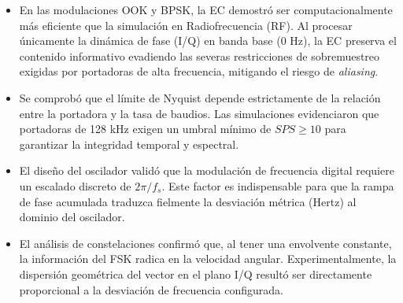
\begin{itemize}
    \item En las modulaciones OOK y BPSK, la EC demostró ser computacionalmente más eficiente que la simulación en Radiofrecuencia (RF). Al procesar únicamente la dinámica de fase (I/Q) en banda base (0 Hz), la EC preserva el contenido informativo evadiendo las severas restricciones de sobremuestreo exigidas por portadoras de alta frecuencia, mitigando el riesgo de \textit{aliasing}.
    
    \item Se comprobó que el límite de Nyquist depende estrictamente de la relación entre la portadora y la tasa de baudios. Las simulaciones evidenciaron que portadoras de 128 kHz exigen un umbral mínimo de $SPS \geq 10$ para garantizar la integridad temporal y espectral.
    
    \item El diseño del oscilador validó que la modulación de frecuencia digital requiere un escalado discreto de $2\pi/f_s$. Este factor es indispensable para que la rampa de fase acumulada traduzca fielmente la desviación métrica (Hertz) al dominio del oscilador.
    
    \item El análisis de constelaciones confirmó que, al tener una envolvente constante, la información del FSK radica en la velocidad angular. Experimentalmente, la dispersión geométrica del vector en el plano I/Q resultó ser directamente proporcional a la desviación de frecuencia configurada.
\end{itemize}